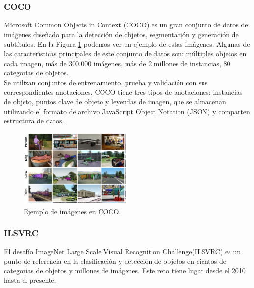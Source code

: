 \documentclass{bmvc2k}
\begin{document}
\subsubsection{COCO}

Microsoft Common Objects in Context (COCO) es un gran conjunto de datos de imágenes diseñado para la detección de objetos, segmentación y generación de subtítulos. En la Figura \ref{fig.coco} podemos ver un ejemplo de estas imágenes. Algunas de las caracterı́sticas principales de este conjunto de datos son: múltiples objetos en cada imagen, más de 300.000 imágenes, más de 2 millones de instancias, 80 categorías de objetos.\\

Se utilizan conjuntos de entrenamiento, prueba y validación con sus correspondientes anotaciones. COCO tiene tres tipos de anotaciones: instancias de objeto, puntos clave de objeto y leyendas de imagen, que se almacenan utilizando el formato de archivo JavaScript Object Notation (JSON) y comparten estructura de datos.\\

\begin{figure}
\begin{center}
	\includegraphics[width=0.5\textwidth]{images/COCO.png}
   \caption{Ejemplo de imágenes en COCO.}
	\label{fig.coco}
\end{center}
\end{figure}


\subsubsection{ILSVRC}

El desafío ImageNet Large Scale Visual Recognition Challenge(ILSVRC) es un punto de referencia en la clasificación y detección de objetos en cientos de categorías de objetos y millones de imágenes. Este reto tiene lugar desde el 2010 hasta el presente.\\
\end{document}
